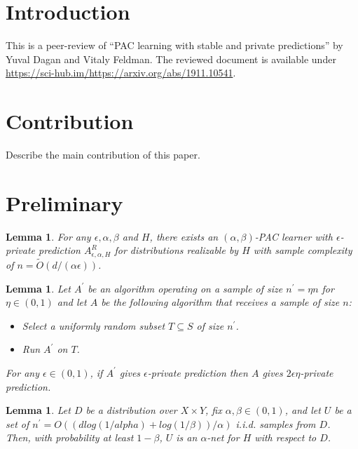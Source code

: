 \documentclass[a4paper,9pt]{scrartcl}
\title{\titletext}
\author{Linbin Yang, Chaoqi Xu}
\newtheorem{lemma}[theorem]{Lemma}
\begin{document}
\maketitle
\section{Introduction}
This is a peer-review of \enquote{PAC learning with stable and private predictions} by Yuval Dagan and Vitaly Feldman. The reviewed document
is available under \href{https://sci-hub.im/https://arxiv.org/abs/1911.10541}{https://sci-hub.im/https://arxiv.org/abs/1911.10541}.

\section{Contribution}

Describe the main contribution of this paper.

\section{Preliminary}

\begin{lemma}
    For any $\epsilon, \alpha, \beta$ and $H$, there exists an $(\alpha, \beta)$-PAC learner with $\epsilon$-private prediction $A_{\epsilon, \alpha, H}^{R}$ for distributions realizable by $H$ with sample complexity of $n = \tilde O(d/(\alpha \epsilon))$.
\end{lemma}

\begin{lemma}
    Let $A^\prime$ be an algorithm operating on a sample of size $n^\prime = \eta n$ for $\eta \in (0, 1)$ and let $A$ be the following algorithm that receives a sample of size $n$:
    \begin{itemize}
        \item Select a uniformly random subset $T \subseteq S$ of size $n^\prime$.
        \item Run $A^\prime$ on $T$.
    \end{itemize}
    For any $\epsilon \in (0, 1)$, if $A^{'}$ gives $\epsilon$-private prediction then $A$ gives $2\epsilon \eta$-private prediction.
\end{lemma}

\begin{lemma}
    Let $D$ be a distribution over $X \times Y$, fix $\alpha, \beta \in (0,1)$, and let $U$ be a set of $n^{'} = O((dlog(1/alpha) + log(1/\beta))/\alpha)$ i.i.d. samples from $D$. Then, with probability at least $1-\beta$, $U$ is an $\alpha$-net for $H$ with respect to $D$.
\end{lemma}
\end{document}
